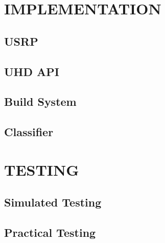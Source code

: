 \documentclass[10pt,twocolumn]{witseiepaper}
\begin{document}
\section{IMPLEMENTATION}
\subsection{USRP}
\subsection{UHD API}
\subsection{Build System}
\subsection{Classifier}

\section{TESTING}
\subsection{Simulated Testing}
\subsection{Practical Testing}



 
\end{document}
